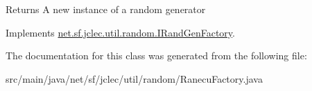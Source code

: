 \begin{DoxyReturn}{Returns}
A new instance of a random generator
\end{DoxyReturn}
 

Implements \hyperlink{interfacenet_1_1sf_1_1jclec_1_1util_1_1random_1_1_i_rand_gen_factory_a03320bb7d2eae4643d02ec66b08db1aa}{net.\-sf.\-jclec.\-util.\-random.\-I\-Rand\-Gen\-Factory}.



The documentation for this class was generated from the following file\-:\begin{DoxyCompactItemize}
\item 
src/main/java/net/sf/jclec/util/random/Ranecu\-Factory.\-java\end{DoxyCompactItemize}
